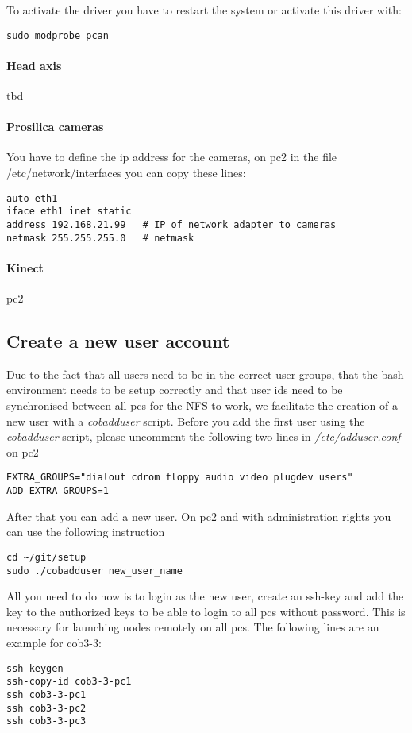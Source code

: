 To activate the driver you have to restart the system or activate this driver with:
\begin{lstlisting}
sudo modprobe pcan
\end{lstlisting}

\paragraph{Head axis}
tbd

\paragraph{Prosilica cameras}
You have to define the ip address for the cameras, on pc2 in the file /etc/network/interfaces you can copy these lines:
\begin{lstlisting}
auto eth1 
iface eth1 inet static
address 192.168.21.99   # IP of network adapter to cameras 
netmask 255.255.255.0   # netmask
\end{lstlisting}

\paragraph{Kinect}
pc2


\subsection{Create a new user account}
\label{sec:account}
Due to the fact that all users need to be in the correct user groups, that the bash environment needs to be setup correctly and that user ids need to be synchronised between all pcs for the NFS to work, we facilitate the creation of a new user with a \textit{cobadduser} script. Before you add the first user using the \textit{cobadduser} script, please uncomment the following two lines in \textit{/etc/adduser.conf} on pc2
\begin{lstlisting}
EXTRA_GROUPS="dialout cdrom floppy audio video plugdev users"
ADD_EXTRA_GROUPS=1
\end{lstlisting}

After that you can add a new user. On pc2 and with administration rights you can use the following instruction
\begin{lstlisting}
cd ~/git/setup
sudo ./cobadduser new_user_name
\end{lstlisting}

All you need to do now is to login as the new user, create an ssh-key and add the key to the authorized keys to be able to login to all pcs without password. This is necessary for launching nodes remotely on all pcs. The following lines are an example for cob3-3:
\begin{lstlisting}
ssh-keygen
ssh-copy-id cob3-3-pc1
ssh cob3-3-pc1
ssh cob3-3-pc2
ssh cob3-3-pc3
\end{lstlisting}

